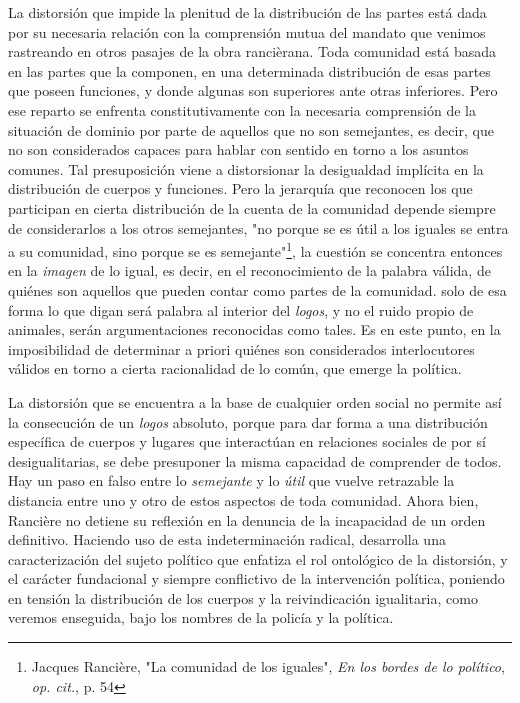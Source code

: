 La distorsión que impide la plenitud de la distribución de las partes
está dada por su necesaria relación con la comprensión mutua del mandato
que venimos rastreando en otros pasajes de la obra rancièrana. Toda
comunidad está basada en las partes que la componen, en una determinada
distribución de esas partes que poseen funciones, y donde algunas son
superiores ante otras inferiores. Pero ese reparto se enfrenta
constitutivamente con la necesaria comprensión de la situación de
dominio por parte de aquellos que no son semejantes, es decir, que no
son considerados capaces para hablar con sentido en torno a los asuntos
comunes. Tal presuposición viene a distorsionar la desigualdad implícita
en la distribución de cuerpos y funciones. Pero la jerarquía que
reconocen los que participan en cierta distribución de la cuenta de la
comunidad depende siempre de considerarlos a los otros semejantes, "no
porque se es útil a los iguales se entra a su comunidad, sino porque se
es semejante"\footnote{Jacques Rancière, "La comunidad de los iguales",
  \emph{En los bordes de lo político}, \emph{op. cit.}, p. 54}, la
cuestión se concentra entonces en la \emph{imagen} de lo igual, es
decir, en el reconocimiento de la palabra válida, de quiénes son
aquellos que pueden contar como partes de la comunidad. solo de esa
forma lo que digan será palabra al interior del \emph{logos}, y no el
ruido propio de animales, serán argumentaciones reconocidas como tales.
Es en este punto, en la imposibilidad de determinar a priori quiénes son
considerados interlocutores válidos en torno a cierta racionalidad de lo
común, que emerge la política.

La distorsión que se encuentra a la base de cualquier orden social no
permite así la consecución de un \emph{logos} absoluto, porque para dar
forma a una distribución específica de cuerpos y lugares que interactúan
en relaciones sociales de por sí desigualitarias, se debe presuponer la
misma capacidad de comprender de todos. Hay un paso en falso entre lo
\emph{semejante} y lo \emph{útil} que vuelve retrazable la distancia
entre uno y otro de estos aspectos de toda comunidad. Ahora bien,
Rancière no detiene su reflexión en la denuncia de la incapacidad de un
orden definitivo. Haciendo uso de esta indeterminación radical,
desarrolla una caracterización del sujeto político que enfatiza el rol
ontológico de la distorsión, y el carácter fundacional y siempre
conflictivo de la intervención política, poniendo en tensión la
distribución de los cuerpos y la reivindicación igualitaria, como
veremos enseguida, bajo los nombres de la policía y la política.

